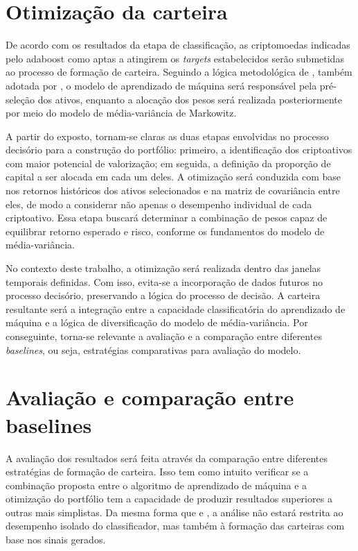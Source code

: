 \section{Otimização da carteira}
\label{sec_otimizacao_da_carteira}

De acordo com os resultados da etapa de classificação, as criptomoedas indicadas pelo \acs{adaboost} como aptas a atingirem os \textit{targets} estabelecidos serão submetidas ao processo de formação de carteira. Seguindo a lógica metodológica de , também adotada por , o modelo de aprendizado de máquina será responsável pela pré-seleção dos ativos, enquanto a alocação dos pesos será realizada posteriormente por meio do modelo de média-variância de Markowitz.

A partir do exposto, tornam-se claras as duas etapas envolvidas no processo decisório para a construção do portfólio: primeiro, a identificação dos criptoativos com maior potencial de valorização; em seguida, a definição da proporção de capital a ser alocada em cada um deles. A otimização será conduzida com base nos retornos históricos dos ativos selecionados e na matriz de covariância entre eles, de modo a considerar não apenas o desempenho individual de cada criptoativo. Essa etapa buscará determinar a combinação de pesos capaz de equilibrar retorno esperado e risco, conforme os fundamentos do modelo de média-variância.

No contexto deste trabalho, a otimização será realizada dentro das janelas temporais definidas. Com isso, evita-se a incorporação de dados futuros no processo decisório, preservando a lógica do processo de decisão. A carteira resultante será a integração entre a capacidade classificatória do aprendizado de máquina e a lógica de diversificação do modelo de média-variância. Por conseguinte, torna-se relevante a avaliação e a comparação entre diferentes \textit{baselines}, ou seja, estratégias comparativas para avaliação do modelo.

\section{Avaliação e comparação entre baselines}
\label{sec_avaliacao_e_baselines}

A avaliação dos resultados será feita através da comparação entre diferentes estratégias de formação de carteira. Isso tem como intuito verificar se a combinação proposta entre o algoritmo de aprendizado de máquina e a otimização do portfólio tem a capacidade de produzir resultados superiores a outras mais simplistas. Da mesma forma que  e , a análise não estará restrita ao desempenho isolado do classificador, mas também à formação das carteiras com base nos sinais gerados.

